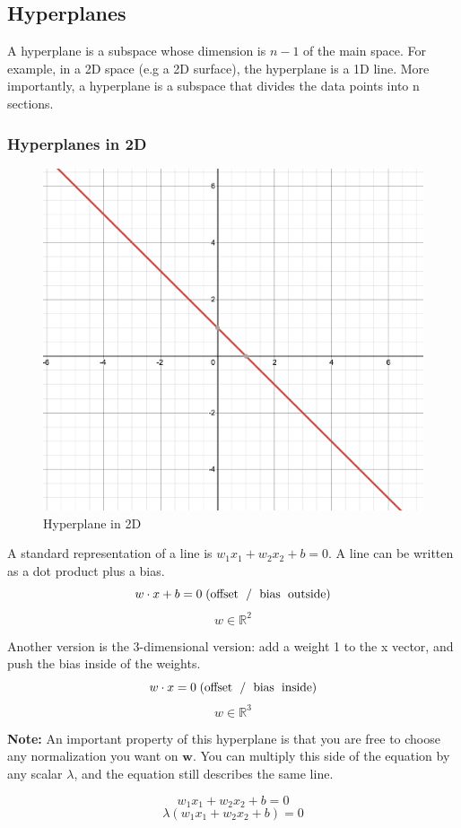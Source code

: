 \documentclass[11pt]{article}
\def\RR{\mathbb{R}}
\begin{document}
\subsection{Hyperplanes}
A hyperplane is a subspace whose dimension is $n-1$ of the main space. For example, in a 2D space (e.g a 2D surface), the hyperplane is a 1D line. More importantly, a hyperplane is a subspace that divides the data points into n sections. 



\subsubsection{Hyperplanes in 2D}
\begin{figure}[H]
  \centering
  \includegraphics[width=.2\linewidth]{images/hyperplane.png}
  \caption{Hyperplane in 2D}
  \label{fig:sfig2}
\end{figure}

A standard representation of a line is $w_1 x_1 + w_2 x_2 + b = 0$. A line can be written as a dot product plus a bias.
$$w \cdot x + b = 0 \; \text{(offset\; / \;bias\; outside)}$$
$$w \in \RR^2 $$

Another version is the 3-dimensional version: add a weight 1 to the x vector, and push the bias inside of the weights.
$$w \cdot x  = 0 \;\text{(offset\; / \;bias\; inside)}$$
$$w \in \RR^3 $$

\textbf{Note:} An important property of this hyperplane is that you are free to choose any normalization you want on $\mathbf{w}$. You can multiply this side of the equation by any scalar $\lambda$, and the equation still describes the same line.
 
$$w_1 x_1 + w_2 x_2 + b = 0$$
$$\lambda(w_1 x_1 + w_2 x_2 + b )= 0$$
\end{document}
